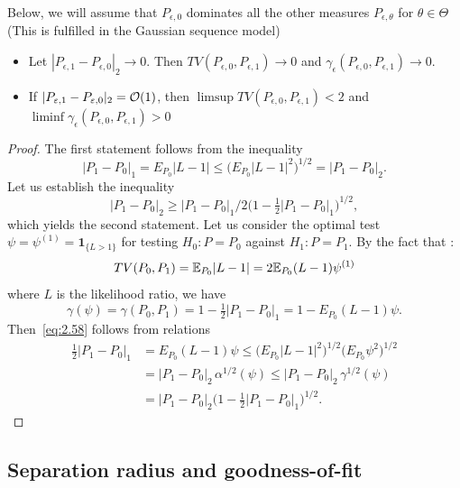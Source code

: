 Below, we will assume that $P_{\epsilon,0}$ dominates all the other measures $P_{\epsilon,\theta}$ for $\theta \in \Theta$ (This is fulfilled in the Gaussian sequence model)
\begin{prop}\citet[Prop. 2.12]{Ing2012}
    \noindent
    \begin{itemize}
        \item Let $|P_{\epsilon,1}-P_{\epsilon,0}|_{2} \rightarrow 0$. Then $TV(P_{\epsilon,0},P_{\epsilon,1}) \rightarrow 0$ and $\gamma_\epsilon(P_{\epsilon,0},P_{\epsilon,1}) \rightarrow 0$.
        \item If $|P_{\varepsilon,1}-P_{\varepsilon,0}|_{2} = \mathcal{O}(1)$, then $\limsup TV(P_{\epsilon,0},P_{\epsilon,1}) < 2$ and $\liminf \gamma_\epsilon(P_{\epsilon,0},P_{\epsilon,1})>0$
    \end{itemize}
\end{prop}
\begin{proof}
The first statement follows from the inequality
\[
  |P_1 - P_0|_1 = E_{P_0}|L - 1| \leq \bigl(E_{P_0}|L - 1|^2\bigr)^{1/2} = |P_1 - P_0|_2.
\]
Let us establish the inequality
\begin{equation}\label{eq:2.58}
  |P_1 - P_0|_2 \geq |P_1 - P_0|_1 / 2\bigl(1 - \tfrac{1}{2}|P_1 - P_0|_1\bigr)^{1/2},
\end{equation}
which yields the second statement. Let us consider the optimal test $\psi = \psi^{(1)} =
\mathbf{1}_{\{L > 1\}}$ for testing $H_0 : P = P_0$ against $H_1 : P = P_1$. By the fact that : 
\begin{equation*}
    TV(P_0,P_1) = \mathbb{E}_{P_0}|L-1| = 2\mathbb{E}_{P_0}(L-1)\psi^{(1)}
\end{equation*}
where $L$ is the likelihood ratio, we have
\[
  \gamma(\psi) = \gamma(P_0, P_1) = 1 - \tfrac{1}{2}|P_1 - P_0|_1 = 1 - E_{P_0}(L - 1)\psi.
\]
Then~\eqref{eq:2.58} follows from relations
\begin{align*}
  \tfrac{1}{2}|P_1 - P_0|_1
   &= E_{P_0}(L - 1)\psi \leq \bigl(E_{P_0}|L - 1|^2\bigr)^{1/2}\bigl(E_{P_0}\psi^2\bigr)^{1/2} \\
   &= |P_1 - P_0|_2\, \alpha^{1/2}(\psi) \leq |P_1 - P_0|_2\, \gamma^{1/2}(\psi) \\
   &= |P_1 - P_0|_2\bigl(1 - \tfrac{1}{2}|P_1 - P_0|_1\bigr)^{1/2}.
\end{align*}
\end{proof}
\subsection{Separation radius and goodness-of-fit}

